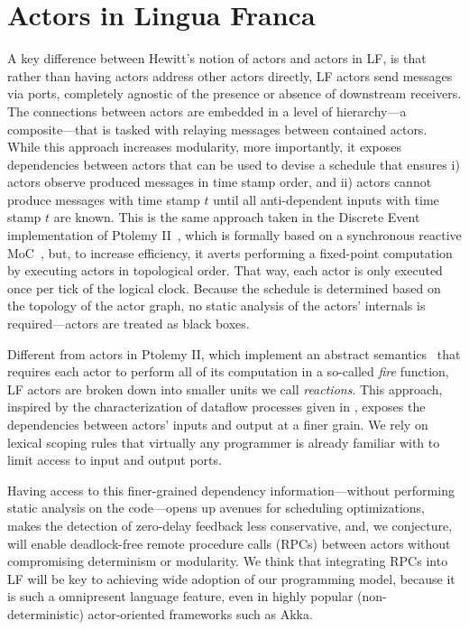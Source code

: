 \documentclass[sigconf]{acmart}
\newcommand{\todo}[1]{\mynote{TODO}{#1}{red}}
\begin{document}
\section{Actors in Lingua Franca}\label{sec:actor}
A key difference between Hewitt's notion of actors and actors in LF, is that rather than having actors address other actors directly, LF actors send messages via ports, completely agnostic of the presence or absence of downstream receivers. The connections between actors are embedded in a level of hierarchy---a composite---that is tasked with relaying messages between contained actors. While this approach increases modularity, more importantly, it exposes dependencies between actors that can be used to devise a schedule that ensures i) actors observe produced messages in time stamp order, and ii) actors cannot produce messages with time stamp $t$ until all anti-dependent inputs with time stamp $t$ are known. This is the same approach taken in the Discrete Event implementation of Ptolemy II~\cite{LeeEtAl:7:DiscreteEvents}, which is formally based on a synchronous reactive MoC~\todo{[Benveniste,Berry,1991]}, but, to increase efficiency, it averts performing a fixed-point computation by executing actors in topological order. That way, each actor is only executed once per tick of the logical clock. Because the schedule is determined based on the topology of the actor graph, no static analysis of the actors' internals is required---actors are treated as black boxes.

Different from actors in Ptolemy II, which implement an abstract semantics~\cite{TripakisEtAl:12:AbstractSemantics} that requires each actor to perform all of its computation in a so-called \emph{fire} function, LF actors are broken down into smaller units we call \emph{reactions}. This approach, inspired by the characterization of dataflow processes given in \cite{LeeMatsikoudis:09:Dataflow}, exposes the dependencies between actors' inputs and output at a finer grain. We rely on lexical scoping rules that virtually any programmer is already familiar with to limit access to input and output ports.

Having access to this finer-grained dependency information---without performing static analysis on the code---opens up avenues for scheduling optimizations, makes the detection of zero-delay feedback less conservative, and, we conjecture, will enable deadlock-free remote procedure calls (RPCs) between actors without compromising determinism or modularity. We think that integrating RPCs into LF will be key to achieving wide adoption of our programming model, because it is such a omnipresent language feature, even in highly popular (non-deterministic) actor-oriented frameworks such as Akka.
\end{document}
